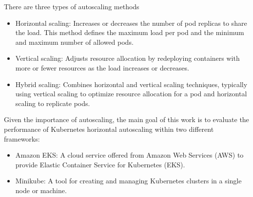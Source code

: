 There are three types of autoscaling methods \cite{Tran_2022} 
\begin{itemize}
    \item Horizontal scaling: Increases or decreases the number of pod replicas to share the load. This method defines the maximum load per pod and the minimum and maximum number of allowed pods.
    \item Vertical scaling: Adjusts resource allocation by redeploying containers with more or fewer resources as the load increases or decreases.
    \item Hybrid scaling: Combines horizontal and vertical scaling techniques, typically using vertical scaling to optimize resource allocation for a pod and horizontal scaling to replicate pods.
\end{itemize}

Given the importance of autoscaling, the main goal of this work is to evaluate the performance of Kubernetes horizontal autoscaling within two different frameworks:
\begin{itemize}
    \item Amazon EKS: A cloud service offered from Amazon Web Services (AWS) to provide Elastic Container Service for Kubernetes (EKS).
    \item Minikube: A tool for creating and managing Kubernetes clusters in a single node or machine.
\end{itemize} 
